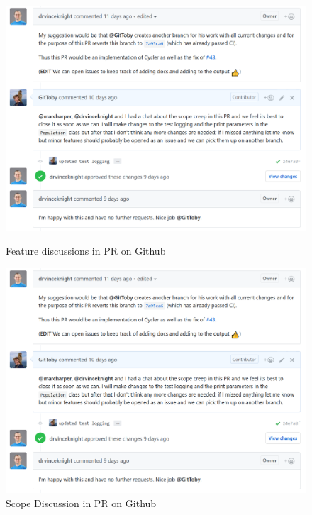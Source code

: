\begin{figure}[ht]
    \centering
    \begin{minipage}{0.48\textwidth}
        \centering
        \includegraphics[width=1.0\textwidth, center,keepaspectratio]{./img/vcs/scope-discussion.png}
        \caption{Feature discussions in PR on Github}\label{fig:PR-discussion}
    \end{minipage}\hfill
    \begin{minipage}{0.48\textwidth}
        \centering
        \includegraphics[width=1.0\textwidth, center,keepaspectratio]{./img/vcs/scope-discussion.png}    
    \caption{Scope Discussion in PR on Github}\label{fig:PR-scope-discussion}
    \end{minipage}
\end{figure}

